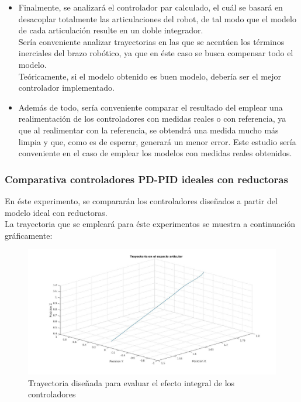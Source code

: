 \begin{itemize}
	\item Finalmente, se analizará el controlador par calculado, el cuál se basará en desacoplar totalmente las articulaciones del robot, de tal modo que el modelo de cada articulación resulte en un doble integrador.\\
	Sería conveniente analizar trayectorias en las que se acentúen los términos inerciales del brazo robótico, ya que en éste caso se busca compensar todo el modelo.\\
	Teóricamente, si el modelo obtenido es buen modelo, debería ser el mejor controlador implementado.\\

	\item Además de todo, sería conveniente comparar el resultado del emplear una realimentación de los controladores con medidas reales o con referencia, ya que al realimentar con la referencia, se obtendrá una medida mucho más limpia y que, como es de esperar, generará un menor error. Este estudio sería conveniente en el caso de emplear los modelos con medidas reales obtenidos.\\
\end{itemize}

\newpage
\subsubsection{Comparativa controladores PD-PID ideales con reductoras}
En éste experimento, se compararán los controladores diseñados a partir del modelo ideal con reductoras. \\
La trayectoria que se empleará para éste experimentos se muestra a continuación gráficamente:
\begin{figure}[h!]
	\centering
	\includegraphics[width=.8\textwidth]{exp1_tray}
	\caption{Trayectoria diseñada para evaluar el efecto integral de los controladores}
\end{figure}

